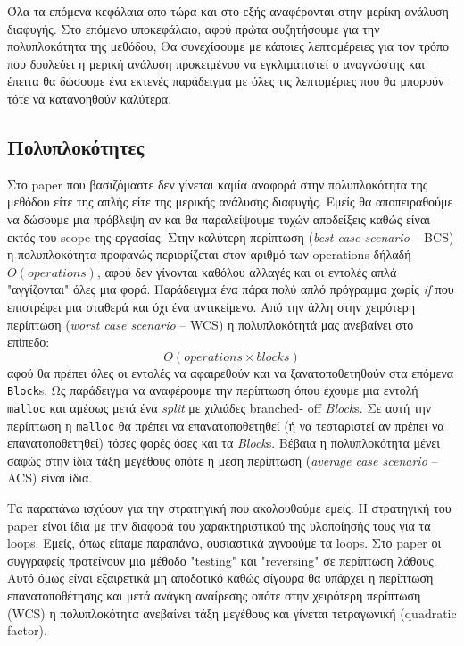 Όλα τα επόμενα κεφάλαια απο τώρα και στο εξής αναφέρονται στην μερίκη ανάλυση
διαφυγής. Στο επόμενο υποκεφάλαιο, αφού πρώτα συζητήσουμε για την πολυπλοκότητα
της μεθόδου, Θα συνεχίσουμε με κάποιες λεπτομέρειες για τον τρόπο που δουλεύει η
μερική ανάλυση προκειμένου να εγκλιματιστεί ο αναγνώστης και έπειτα θα δώσουμε
ένα εκτενές παράδειγμα με όλες τις λεπτομέριες που θα μπορούν τότε να
κατανοηθούν καλύτερα.

\subsection{Πολυπλοκότητες}

Στο paper που βασιζόμαστε\cite{stadler2014partial} δεν γίνεται καμία αναφορά
στην πολυπλοκότητα της μεθόδου είτε της απλής είτε της μερικής ανάλυσης
διαφυγής. Εμείς θα αποπειραθούμε να δώσουμε μια πρόβλεψη αν και θα
παραλείψουμε τυχών αποδείξεις καθώς είναι εκτός του scope της εργασίας. Στην
καλύτερη περίπτωση (\textit{best case scenario} – BCS) η πολυπλοκότητα
προφανώς περιορίζεται στον αριθμό των operations δήλαδή $O(operations)$, αφού
δεν γίνονται καθόλου αλλαγές και οι εντολές απλά "αγγίζονται" όλες μια φορά.
Παράδειγμα ένα πάρα πολύ απλό πρόγραμμα χωρίς \textit{if} που επιστρέφει μια
σταθερά και όχι ένα αντικείμενο. Από την άλλη στην χειρότερη περίπτωση
(\textit{worst case scenario} – WCS) η πολυπλοκότητά μας ανεβαίνει στο
επίπεδο:
\[
O(operations \times blocks)
\]
αφού θα πρέπει όλες οι εντολές να αφαιρεθούν και να ξανατοποθετηθούν στα επόμενα
\texttt{Block}s. Ως παράδειγμα να αναφέρουμε την περίπτωση όπου έχουμε μια
εντολή \texttt{malloc} και αμέσως μετά ένα \textit{split} με χιλιάδες branched-
off \textit{Block}s. Σε αυτή την περίπτωση η \texttt{malloc} θα πρέπει να
επανατοποθετηθεί (ή να τεσταριστεί αν πρέπει να επανατοποθετηθεί) τόσες φορές
όσες και τα \textit{Block}s. Βέβαια η πολυπλοκότητα μένει σαφώς στην ίδια τάξη
μεγέθους οπότε η μέση περίπτωση (\textit{average case scenario} – ACS) είναι
ίδια.

Τα παραπάνω ισχύουν για την στρατηγική που ακολουθούμε εμείς. Η στρατηγική του
paper είναι ίδια με την διαφορά του χαρακτηριστικού της υλοποίησής τους για τα
loops. Εμείς, όπως είπαμε παραπάνω, ουσιαστικά αγνοούμε τα loops. Στο paper οι
συγγραφείς προτείνουν μια μέθοδο "testing" και "reversing" σε περίπτωση λάθους.
Αυτό όμως είναι εξαιρετικά μη αποδοτικό καθώς σίγουρα θα υπάρχει η περίπτωση
επανατοποθέτησης και μετά ανάγκη αναίρεσης οπότε στην χειρότερη περίπτωση (WCS)
η πολυπλοκότητα ανεβαίνει τάξη μεγέθους και γίνεται τετραγωνική (quadratic
factor).

